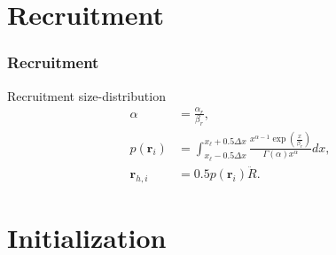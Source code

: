 \documentclass{beamer}
\begin{document}

\section{Recruitment}


\begin{frame}
\frametitle{Recruitment}
Recruitment size-distribution
\begin{align*}
  \alpha &= \frac{\alpha_r}{\beta_r},\\
  p(\boldsymbol{r}_i) &= \int^{x_\ell+0.5 \Delta x}_{x_\ell-0.5 \Delta x}
  \frac{x^{\alpha-1} \exp
    \left(\frac{x}{\beta_r}\right)}{\Gamma (\alpha) x^\alpha} dx,\\
  \boldsymbol{r}_{h,i} &= 0.5 p(\boldsymbol{r}_i) \ddot{R}.
\end{align*}
\end{frame}


\section{Initialization}

\end{document}
